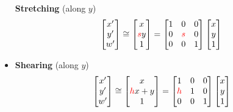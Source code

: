 \begin{itemize}
    \textbf{Stretching} (along $y$) \[
        \begin{bmatrix}
            x' \\ y' \\ w'
        \end{bmatrix} \cong \begin{bmatrix}
            x \\ {\color{red} s} y \\ 1
        \end{bmatrix} = \begin{bmatrix}
            1 & 0 & 0 \\
            0 & {\color{red} s} & 0 \\
            0 & 0 & 1
        \end{bmatrix} \begin{bmatrix}
            x \\ y \\ 1
        \end{bmatrix}
    \]

    \item \textbf{Shearing} (along $y$) \[
        \begin{bmatrix}
            x' \\ y' \\ w'
        \end{bmatrix} \cong \begin{bmatrix}
            x \\ {\color{red} h} x + y \\ 1
        \end{bmatrix} = \begin{bmatrix}
            1 & 0 & 0 \\
            {\color{red} h} & 1 & 0 \\
            0 & 0 & 1
        \end{bmatrix} \begin{bmatrix}
            x \\ y \\ 1
        \end{bmatrix}
    \]


\end{itemize}
